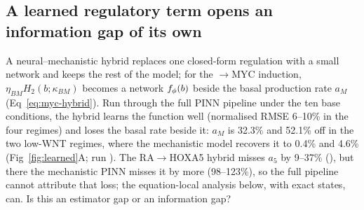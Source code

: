 \subsection{A learned regulatory term opens an information gap of its own}
\label{sec:res-hybrid}

A neural--mechanistic hybrid replaces one closed-form regulation with a small
network and keeps the rest of the model; for the \bcat{}$\to$MYC induction,
$\eta_{BM}H_2(b;\kappa_{BM})$ becomes a network $f_{\phi}(b)$ beside the basal
production rate $a_M$ (Eq~\eqref{eq:myc-hybrid}). Run through the full PINN
pipeline under the ten base conditions, the hybrid learns the function well
(normalised RMSE 6--10\% in the four regimes) and loses the basal rate beside
it: $a_M$ is 32.3\% and 52.1\% off in the two low-WNT regimes, where the
mechanistic model recovers it to 0.4\% and 4.6\% (Fig~\ref{fig:learned}A;
run ). The RA$\to$HOXA5 hybrid misses $a_5$ by
9--37\% (), but there the mechanistic PINN
misses it by more (98--123\%), so the full pipeline cannot attribute that
loss; the equation-local analysis below, with exact states, can. Is this an estimator gap or an
information gap?

